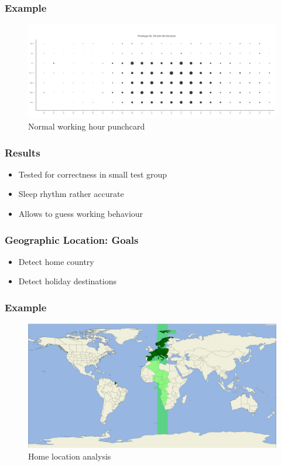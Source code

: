 \documentclass[t]{beamer}
\begin{document}
\begin{frame}
    \frametitle{Example}
    \vspace{1cm}
    \begin{figure}[H]
        \includegraphics[scale=0.22]{analysis-affinity/28}
        \centering
        \caption{Normal working hour punchcard}
    \end{figure}
\end{frame}

\begin{frame}
    \frametitle{Results}
    \vspace{1cm}
    \begin{itemize}
        \item Tested for correctness in small test group
        \pause{}
        \item Sleep rhythm rather accurate
        \pause{}
        \item Allows to guess working behaviour
    \end{itemize}
\end{frame}

\begin{frame}
    \frametitle{Geographic Location: Goals}
    \vspace{1cm}
    \begin{itemize}
        \item Detect home country
        \pause{}
        \item Detect holiday destinations
    \end{itemize}
\end{frame}

\begin{frame}
    \frametitle{Example}
    \begin{figure}[H]
        \includegraphics[scale=0.06]{analysis/author-home-location}
        \centering
        \caption{Home location analysis}
    \end{figure}
\end{frame}
\end{document}
